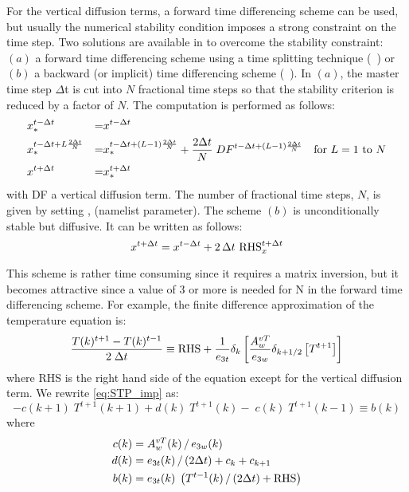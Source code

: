 \documentclass[../main/NEMO_manual]{subfiles}
\begin{document}
For the vertical diffusion terms, a forward time differencing scheme can be used,
but usually the numerical stability condition imposes a strong constraint on the time step.
Two solutions are available in \NEMO to overcome the stability constraint:
$(a)$ a forward time differencing scheme using a time splitting technique (~) or
$(b)$ a backward (or implicit) time differencing scheme                   (~).
In $(a)$, the master time step $\Delta$t is cut into $N$ fractional time steps so that
the stability criterion is reduced by a factor of $N$.
The computation is performed as follows:
\begin{alignat*}{2}
  &x_\ast^{t - \Delta t}                      &= &x^{t - \Delta t} \\
  &x_\ast^{t - \Delta t + L \frac{2 \Delta t}{N}} &=   &x_\ast ^{t - \Delta t + (L - 1) \frac{2 \Delta t}{N}}
                                             + \frac{2 \Delta t}{N} \; DF^{t - \Delta t + (L - 1) \frac{2 \Delta t}{N}}
  \quad \text{for $L = 1$ to $N$} \\
  &x^{t + \Delta t}                           &= &x_\ast^{t + \Delta t}
\end{alignat*}
with DF a vertical diffusion term.
The number of fractional time steps, $N$, is given by setting , (namelist parameter).
The scheme $(b)$ is unconditionally stable but diffusive. It can be written as follows:
\begin{equation}
  \label{eq:STP_imp}
  x^{t + \Delta t} = x^{t - \Delta t} + 2 \, \Delta t \ \text{RHS}_x^{t + \Delta t}
\end{equation}


This scheme is rather time consuming since it requires a matrix inversion,
but it becomes attractive since a value of 3 or more is needed for N in the forward time differencing scheme.
For example, the finite difference approximation of the temperature equation is:
\[
  \frac{T(k)^{t + 1} - T(k)^{t - 1}}{2 \; \Delta t}
  \equiv
  \text{RHS} + \frac{1}{e_{3t}} \delta_k \left[ \frac{A_w^{vT}}{e_{3w} } \delta_{k + 1/2} \left[ T^{t + 1} \right] \right]
\]
where RHS is the right hand side of the equation except for the vertical diffusion term.
We rewrite \autoref{eq:STP_imp} as:
\begin{equation}
  \label{eq:STP_imp_mat}
  -c(k + 1) \; T^{t + 1}(k + 1) + d(k) \; T^{t + 1}(k) - \; c(k) \; T^{t + 1}(k - 1) \equiv b(k)
\end{equation}
where 
\begin{align*} 
  c(k) &= A_w^{vT} (k) \, / \, e_{3w} (k)     \\
  d(k) &= e_{3t}   (k)       \, / \, (2 \Delta t) + c_k + c_{k + 1}    \\
  b(k) &= e_{3t}   (k) \; \left( T^{t - 1}(k) \, / \, (2 \Delta t) + \text{RHS} \right)
\end{align*}
\end{document}

